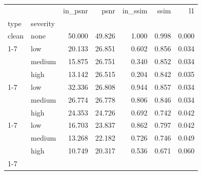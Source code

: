 \begin{tabular}{llrrrrr}
\toprule
 &  & in_psnr & psnr & in_ssim & ssim & l1 \\
type & severity &  &  &  &  &  \\
\midrule
clean & none & 50.000 & 49.826 & 1.000 & 0.998 & 0.000 \\
\cline{1-7}
\multirow[t]{3}{*}{salt_pepper} & low & 20.133 & 26.851 & 0.602 & 0.856 & 0.034 \\
 & medium & 15.875 & 26.751 & 0.340 & 0.852 & 0.034 \\
 & high & 13.142 & 26.515 & 0.204 & 0.842 & 0.035 \\
\cline{1-7}
\multirow[t]{3}{*}{blur} & low & 32.336 & 26.808 & 0.944 & 0.857 & 0.034 \\
 & medium & 26.774 & 26.778 & 0.806 & 0.846 & 0.034 \\
 & high & 24.353 & 24.726 & 0.692 & 0.742 & 0.042 \\
\cline{1-7}
\multirow[t]{3}{*}{occlusion} & low & 16.703 & 23.837 & 0.862 & 0.797 & 0.042 \\
 & medium & 13.268 & 22.182 & 0.726 & 0.746 & 0.049 \\
 & high & 10.749 & 20.317 & 0.536 & 0.671 & 0.060 \\
\cline{1-7}
\bottomrule
\end{tabular}

